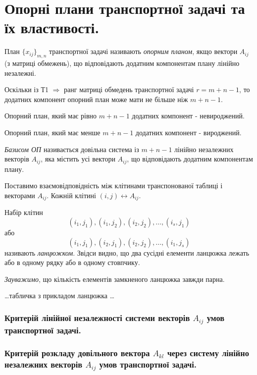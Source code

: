 \documentclass[12pt,a4paper]{report}
\newenvironment{slim_itemize}{
\begin{itemize}
  \setlength{\itemsep}{1pt}
  \setlength{\parskip}{0pt}
  \setlength{\parsep}{0pt}}
{\end{itemize}}
\begin{document}
\clearpage

\chapter{Опорні плани транспортної задачі та їх властивості.}

План $\{x_{ij}\}_{m,n}$ транспортної задачі називають \emph{опорним планом}, якщо вектори $A_{ij}$ (з матриці обмежень), що відповідають додатним компонентам плану лінійно незалежні.

Оскільки із Т1 $\Rightarrow$ ранг матриці обмедень транспортної задачі $r=m+n-1$, то додатних компонент опорний план може мати не більше ніж $m+n-1$.

\begin{slim_itemize}
  \item Опорний план, який має рівно $m+n-1$ додатних компонент - невироджений.
  \item Опорний план, який має менше $m+n-1$ додатних компонент - вироджений.
\end{slim_itemize}

\emph{Базисом ОП} називається довільна система із $m+n-1$ лінійно незалежних векторів $A_{ij}$, яка містить усі вектори $A_{ij}$, що відповідають додатним компонентам плану.

Поставимо взаємовідповідність між клітинами транспонованої таблиці і векторами $A_{ij}$. Кожній клітині $(i,j) \leftrightarrow A_{ij}$.

Набір клітин 
\[ (i_1,j_1),(i_1,j_2),(i_2,j_2),\dots,(i_s,j_1) \]
або
\[ (i_1,j_1),(i_2,j_1),(i_2,j_2),\dots,(i_1,j_s) \]
називають \emph{ланцюжком}. Звідси видно, що два сусідні елементи ланцюжка лежать або в одному рядку або в одному стовпчику.

\emph{Зауважимо}, що кількість елементів замкненого ланцюжка завжди парна.

\dots табличка з прикладом ланцюжка \dots

\subsection{Критерій лінійної незалежності системи векторів $A_{ij}$ умов транспортної задачі.}

\subsection{Критерій розкладу довільного вектора $A_{kl}$ через систему лінійно незалежних векторів $A_{ij}$ умов транспортної задачі.}
\end{document}
